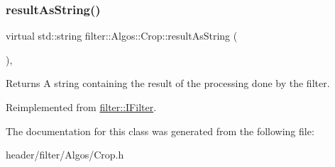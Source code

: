 \subsubsection{\texorpdfstring{result\+As\+String()}{resultAsString()}}
{\footnotesize\ttfamily virtual std\+::string filter\+::\+Algos\+::\+Crop\+::result\+As\+String (\begin{DoxyParamCaption}{ }\end{DoxyParamCaption})\hspace{0.3cm}{\ttfamily [inline]}, {\ttfamily [virtual]}}

\begin{DoxyReturn}{Returns}
A string containing the result of the processing done by the filter. 
\end{DoxyReturn}


Reimplemented from \hyperlink{classfilter_1_1_i_filter_ab99902b060a6d9edc3452a8c9f85e37e}{filter\+::\+I\+Filter}.



The documentation for this class was generated from the following file\+:\begin{DoxyCompactItemize}
\item 
header/filter/\+Algos/Crop.\+h\end{DoxyCompactItemize}
